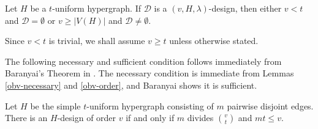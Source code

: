 \begin{lemma} \label{obv-order}
Let $H$ be a $t$-uniform hypergraph. If $\mathcal{D}$ is a $(v, H, \lambda)$-design, then either $v < t$ and $\mathcal{D} = \emptyset$ or $v \geq |V(H)|$ and $\mathcal{D} \neq \emptyset$.
\end{lemma}

Since $v < t$ is trivial, we shall assume $v \geq t$ unless otherwise stated.

The following necessary and sufficient condition follows immediately from Baranyai's Theorem in \cite{baran}. The necessary condition is immediate from Lemmas \ref{obv-necessary} and \ref{obv-order}, and Baranyai shows it is sufficient.

\begin{theorem} \label{baranyai}
Let $H$ be the simple $t$-uniform hypergraph consisting of $m$ pairwise disjoint edges. There is an $H$-design of order $v$ if and only if $m$ divides ${v \choose t}$ and $mt \leq v$.
\end{theorem}
